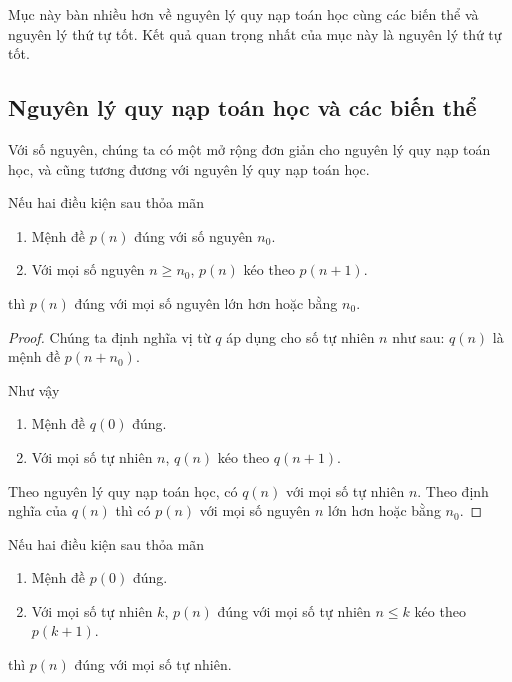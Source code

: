 Mục này bàn nhiều hơn về nguyên lý quy nạp toán học cùng các biến thể và nguyên lý thứ tự tốt. Kết quả quan trọng nhất của mục này là nguyên lý thứ tự tốt.

\subsection*{Nguyên lý quy nạp toán học và các biến thể}

Với số nguyên, chúng ta có một mở rộng đơn giản cho nguyên lý quy nạp toán học, và cũng tương đương với nguyên lý quy nạp toán học.

\begin{theorem}
	Nếu hai điều kiện sau thỏa mãn
	\begin{enumerate}[label={(\roman*)}]
		\item Mệnh đề $p(n)$ đúng với số nguyên $n_{0}$.
		\item Với mọi số nguyên $n\geq n_{0}$, $p(n)$ kéo theo $p(n + 1)$.
	\end{enumerate}

	thì $p(n)$ đúng với mọi số nguyên lớn hơn hoặc bằng $n_{0}$.
\end{theorem}

\begin{proof}
	Chúng ta định nghĩa vị từ $q$ áp dụng cho số tự nhiên $n$ như sau: $q(n)$ là mệnh đề $p(n + n_{0})$.

	Như vậy
	\begin{enumerate}[label={(\roman*)}]
		\item Mệnh đề $q(0)$ đúng.
		\item Với mọi số tự nhiên $n$, $q(n)$ kéo theo $q(n + 1)$.
	\end{enumerate}

	Theo nguyên lý quy nạp toán học, có $q(n)$ với mọi số tự nhiên $n$. Theo định nghĩa của $q(n)$ thì có $p(n)$ với mọi số nguyên $n$ lớn hơn hoặc bằng $n_{0}$.
\end{proof}

\begin{theorem}
	Nếu hai điều kiện sau thỏa mãn
	\begin{enumerate}[label={(\roman*)}]
		\item Mệnh đề $p(0)$ đúng.
		\item Với mọi số tự nhiên $k$, $p(n)$ đúng với mọi số tự nhiên $n\leq k$ kéo theo $p(k+1)$.
	\end{enumerate}

	thì $p(n)$ đúng với mọi số tự nhiên.
\end{theorem}

